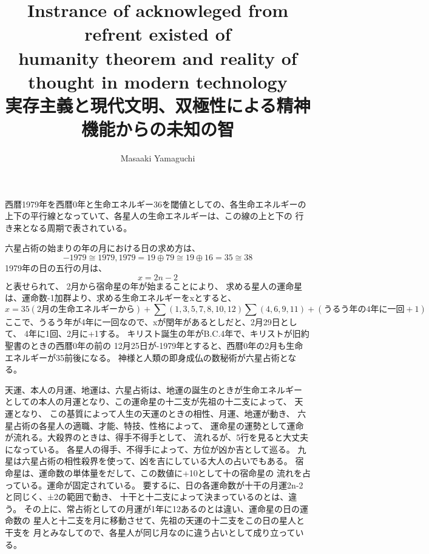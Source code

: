 \documentclass{jsarticle}
\begin{document}
{  西暦1979年を西暦0年と生命エネルギー36を閾値としての、各生命エネルギーの
  上下の平行線となっていて、各星人の生命エネルギーは、この線の上と下の
  行き来となる周期で表されている。
  
  六星占術の始まりの年の月における日の求め方は、　
  $$ -1979 \cong 1979, 1979 = 19 \oplus 79 \cong 19 \oplus 16 = 35 \cong 38 $$
  1979年の日の五行の月は、
  $$ x = 2n - 2 $$
  と表せられて、
  2月から宿命星の年が始まることにより、
  求める星人の運命星は、運命数-1加群より、求める生命エネルギーをxとすると、
  $$ x = 35(2月の生命エネルギーから) + \sum(1,3,5,7,8,10,12) \sum(4,6,9,11) 
  + (うるう年の4年に一回+1) $$
  ここで、うるう年が4年に一回なので、xが閏年があるとしだと、2月29日として、
  4年に1回、2月に+1する。
  キリスト誕生の年がB.C.4年で、キリストが旧約聖書のときの西暦0年の前の
  12月25日が-1979年とすると、西暦0年の2月も生命エネルギーが35前後になる。
  神様と人類の即身成仏の数秘術が六星占術となる。

  天運、本人の月運、地運は、六星占術は、地運の誕生のときが生命エネルギー
  としての本人の月運となり、この運命星の十二支が先祖の十二支によって、
  天運となり、
  この基質によって人生の天運のときの相性、月運、地運が動き、
  六星占術の各星人の適職、才能、特技、性格によって、
  運命星の運勢として運命が流れる。大殺界のときは、得手不得手として、
  流れるが、5行を見ると大丈夫になっている。
  各星人の得手、不得手によって、方位が凶か吉として巡る。
  九星は六星占術の相性殺界を使って、凶を吉にしている大人の占いでもある。
  宿命星は、運命数の単体量をだして、この数値に+10として十の宿命星の
  流れを占っている。運命が固定されている。
  要するに、日の各運命数が十干の月運2n-2と同じく、±2の範囲で動き、
  十干と十二支によって決まっているのとは、違う。
  その上に、常占術としての月運が1年に12あるのとは違い、運命星の日の運命数の
  星人と十二支を月に移動させて、先祖の天運の十二支をこの日の星人と干支を
  月とみなしてので、各星人が同じ月なのに違う占いとして成り立っている。





\newpage
\title{Instrance of acknowleged from refrent existed of \\
       humanity theorem and reality of thought in modern technology \\
       実存主義と現代文明、双極性による精神機能からの未知の智}
\author{Masaaki Yamaguchi}

}
\end{document}

